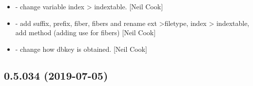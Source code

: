 \documentclass[a4paper,10pt,english]{report}
\begin{document}
\begin{itemize}
\item {} 
 - change variable index \textendash{}\textgreater{} indextable. {[}Neil Cook{]}

\item {} 
 - add suffix, prefix, fiber, fibers and rename ext
\textendash{}\textgreater{}filetype, index \textendash{}\textgreater{} indextable, add method  (adding use
for fibers) {[}Neil Cook{]}

\item {} 
 - change how dbkey is obtained. {[}Neil Cook{]}

\end{itemize}


\subsection{0.5.034 (2019-07-05)}
\end{document}

